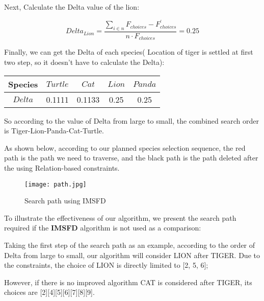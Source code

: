 \documentclass{mcmthesis}
\begin{document}
				Next, Calculate the Delta value of the lion:
			
				\begin{equation}
				Delta_{Lion} = \frac { \sum _ { i \in n } F_{choices} - F_{choices}^{'} } { n \cdot F_{choices} } = 0.25
				\end{equation}
				
				Finally, we can get the Delta of each species( Location of tiger is settled at first two step, so it doesn't have to calculate the Delta):
				
				
				\begin{table}[h]
					\centering
					\setlength{\tabcolsep}{6mm}
					\begin{tabular}{ccccc}
						\toprule[1.5pt]  %
						Species & $Turtle$ & $Cat$ & $Lion$ & $Panda$ \\
						\midrule  %
						$Delta$ & 0.1111 & 0.1133 & 0.25 & 0.25 \\
						\bottomrule[1pt] %
					\end{tabular}
				\end{table}
			
				So according to the value of Delta from large to small, the combined search order is Tiger-Lion-Panda-Cat-Turtle.
				
				
				
				
				As shown below, according to our planned species selection sequence, the red path is the path we need to traverse, and the black path is the path deleted after the using Relation-based constraints.
				
				\clearpage
				
				\begin{figure}[h]
					\small
					\centering
					\texttt{[image: path.jpg]}
					\caption{Search path using IMSFD} 
					\label{fig:path}
				\end{figure}
			
				To illustrate the effectiveness of our algorithm, we present the search path required if the \textbf{IMSFD} algorithm is not used as a comparison:
				
				Taking the first step of the search path as an example, according to the order of Delta from large to small, our algorithm will consider LION after TIGER. Due to the constraints, the choice of LION is directly limited to [2, 5, 6]; 
				
				However, if there is no improved algorithm  CAT is considered after TIGER, its choices are [2][4][5][6][7][8][9].
				
\end{document}
